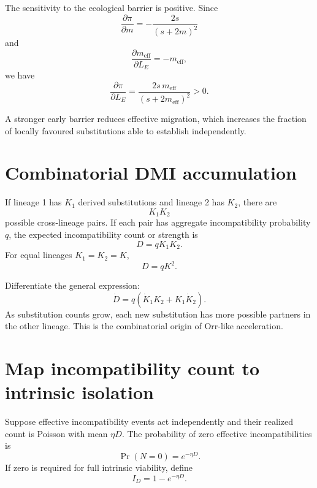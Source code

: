 The sensitivity to the ecological barrier is positive. Since
\begin{equation}
\frac{\partial\pi}{\partial m}
=-\frac{2s}{(s+2m)^2}
\end{equation}
and
\begin{equation}
\frac{\partial m_{\mathrm{eff}}}{\partial L_E}
=-m_{\mathrm{eff}},
\end{equation}
we have
\begin{equation}
\boxed{
\frac{\partial\pi}{\partial L_E}
=\frac{2s\,m_{\mathrm{eff}}}{(s+2m_{\mathrm{eff}})^2}>0.}
\label{eq:establishmentBarrierSensitivity}
\end{equation}

\inwords A stronger early barrier reduces effective migration, which increases the fraction of locally favoured substitutions able to establish independently.

\section{Combinatorial DMI accumulation}

If lineage 1 has \(K_1\) derived substitutions and lineage 2 has \(K_2\), there are
\begin{equation}
K_1K_2
\end{equation}
possible cross-lineage pairs. If each pair has aggregate incompatibility probability \(q\), the expected incompatibility count or strength is
\begin{equation}
\boxed{D=qK_1K_2.}
\label{eq:DMIcount}
\end{equation}
For equal lineages \(K_1=K_2=K\),
\begin{equation}
D=qK^2.
\end{equation}

Differentiate the general expression:
\begin{equation}
\dot D=q(\dot K_1K_2+K_1\dot K_2).
\end{equation}
As substitution counts grow, each new substitution has more possible partners in the other lineage. This is the combinatorial origin of Orr-like acceleration.

\section{Map incompatibility count to intrinsic isolation}

Suppose effective incompatibility events act independently and their realized count is Poisson with mean \(\eta D\). The probability of zero effective incompatibilities is
\begin{equation}
\Pr(N=0)=e^{-\eta D}.
\end{equation}
If zero is required for full intrinsic viability, define
\begin{equation}
\boxed{I_D=1-e^{-\eta D}.}
\label{eq:DMIisolation}
\end{equation}

